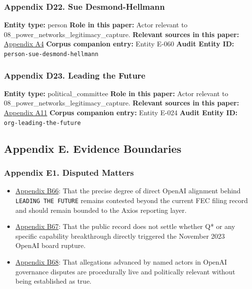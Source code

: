 \documentclass[
  american,
  11pt,
  letterpaper,
]{article}
\providecommand{\tightlist}{%
  \setlength{\itemsep}{0pt}\setlength{\parskip}{0pt}}
\begin{document}
\subsubsection{Appendix D22. Sue
Desmond-Hellmann}\label{ch-08-appendix-d22-sue-desmond-hellmann}

\textbf{Entity type:} person \textbf{Role in this paper:} Actor relevant
to 08\_power\_networks\_legitimacy\_capture. \textbf{Relevant sources in
this paper:}
\hyperref[ch-08-appendix-a4-openai-announces-new-members-to-board-of-directors]{Appendix
A4} \textbf{Corpus companion entry:} Entity E-060 \textbf{Audit Entity
ID:} \texttt{person-sue-desmond-hellmann}

\subsubsection{Appendix D23. Leading the
Future}\label{ch-08-appendix-d23-leading-the-future}

\textbf{Entity type:} political\_committee \textbf{Role in this paper:}
Actor relevant to 08\_power\_networks\_legitimacy\_capture.
\textbf{Relevant sources in this paper:}
\hyperref[ch-08-appendix-a11-leading-the-future-committee-overview]{Appendix
A11} \textbf{Corpus companion entry:} Entity E-024 \textbf{Audit Entity
ID:} \texttt{org-leading-the-future}

\subsection{Appendix E. Evidence
Boundaries}\label{appendix-e.-evidence-boundaries-8}

\subsubsection{Appendix E1. Disputed
Matters}\label{ch-08-appendix-e1-disputed-matters}

\begin{itemize}
\tightlist
\item
  \hyperref[ch-08-appendix-b66-the-precise-degree-of-direct-openai-alignment-behind-leading-the-future-remains-c]{Appendix
  B66}: That the precise degree of direct OpenAI alignment behind
  \texttt{LEADING\ THE\ FUTURE} remains contested beyond the current FEC
  filing record and should remain bounded to the Axios reporting layer.
\item
  \hyperref[ch-08-appendix-b67-the-public-record-does-not-settle-whether-q-or-any-specific-capability-breakthro]{Appendix
  B67}: That the public record does not settle whether Q* or any
  specific capability breakthrough directly triggered the November 2023
  OpenAI board rupture.
\item
  \hyperref[ch-08-appendix-b68-allegations-advanced-by-named-actors-in-openai-governance-disputes-are-procedural]{Appendix
  B68}: That allegations advanced by named actors in OpenAI governance
  disputes are procedurally live and politically relevant without being
  established as true.
\end{itemize}
\end{document}
